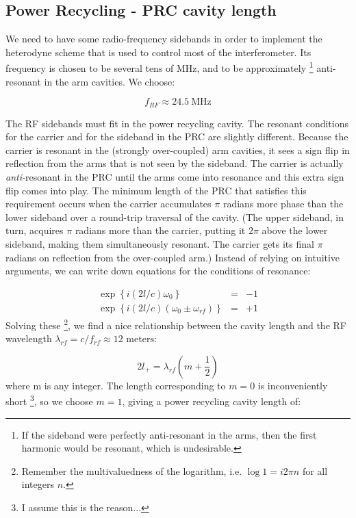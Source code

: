 \subsection*{Power Recycling - PRC cavity length}

We need to have some radio-frequency sidebands in order to implement
the heterodyne scheme that is used to control most of the interferometer.
Its frequency is chosen to be several tens of MHz, and to be approximately%
\footnote{If the sideband were perfectly anti-resonant in the arms, then the
first harmonic would be resonant, which is undesirable.%
} anti-resonant in the arm cavities. We choose:

\[
f_{RF}\approx24.5\mathrm{{\ MHz}}
\]


The RF sidebands must fit in the power recycling cavity. The resonant
conditions for the carrier and for the sideband in the PRC are slightly
different. Because the carrier is resonant in the (strongly over-coupled)
arm cavities, it sees a sign flip in reflection from the arms that
is not seen by the sideband. The carrier is actually \emph{anti-}resonant
in the PRC until the arms come into resonance and this extra sign
flip comes into play. The minimum length of the PRC that satisfies
this requirement occurs when the carrier accumulates $\pi$ radians
more phase than the lower sideband over a round-trip traversal of
the cavity. (The upper sideband, in turn, acquires $\pi$ radians
more than the carrier, putting it $2\pi$ above the lower sideband,
making them simultaneously resonant. The carrier gets its final $\pi$
radians on reflection from the over-coupled arm.) Instead of relying
on intuitive arguments, we can write down equations for the conditions
of resonance:

\begin{eqnarray}
\exp \left\{i (2l/c)\omega_{0}  \right\} &=& -1 \\
\exp \left\{i (2l/c)(\omega_{0} \pm \omega_{rf}) \right\} &=& +1
\end{eqnarray}Solving these%
\footnote{Remember the multivaluedness of the logarithm, i.e. $\log1=i2\pi n$
for all integers $n$.%
}, we find a nice relationship between the cavity length and the RF
wavelength $\lambda_{rf}=c/f_{rf}\approx12\text{ meters}$:

\[
2l_{+}=\lambda_{rf}\left(m+\frac{1}{2}\right)
\]
where m is any integer. The length corresponding to $m=0$ is inconveniently
short%
\footnote{I assume this is the reason...%
}, so we choose $m=1$, giving a power recycling cavity length of:

